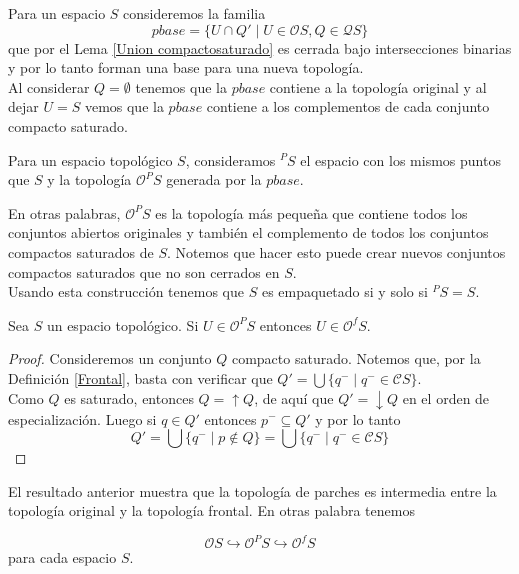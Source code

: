 Para un espacio $S$ consideremos la familia 
\[
pbase=\{U\cap Q'\mid U\in \mathcal{O}S, Q\in \mathcal{Q}S\}
\]
que por el Lema \ref{Union compactosaturado} es cerrada bajo intersecciones binarias y por lo tanto forman una base para una nueva topología.\\

Al considerar $Q=\emptyset$ tenemos que la $pbase$ contiene a la topología original y al dejar $U=S$ vemos que la $pbase$ contiene a los complementos de cada conjunto compacto saturado.\\

\begin{dfn}
    Para un espacio topológico $S$, consideramos $^PS$ el espacio con los mismos puntos que $S$ y la topología $\mathcal{O}^PS$ generada por la $pbase$.
\end{dfn}

En otras palabras, $\mathcal{O}^PS$ es la topología más pequeña que contiene todos los conjuntos abiertos originales y también el complemento de todos los conjuntos compactos saturados de $S$. Notemos que hacer esto puede crear nuevos conjuntos compactos saturados que no son cerrados en $S$.\\

Usando esta construcción tenemos que $S$ es empaquetado si y solo si $^PS=S$.

\begin{lem}
    Sea $S$ un espacio topológico. Si $U\in \mathcal{O}^PS$ entonces $U\in\mathcal{O}^fS$.
\end{lem}

\begin{proof}
    Consideremos un conjunto $Q$ compacto saturado. Notemos que, por la Definición \ref{Frontal}, basta con verificar que $Q'=\bigcup\{q^-\mid q^-\in \mathcal{C}S\}$.\\

    Como $Q$ es saturado, entonces $Q=\uparrow Q$, de aquí que $Q'=\downarrow Q$ en el orden de especialización. Luego si $q\in Q'$ entonces $p^-\subseteq Q'$ y por lo tanto 
    \[
    Q'=\bigcup\{q^-\mid p\notin Q\}=\bigcup\{q^-\mid q^-\in \mathcal{C}S\}
    \]
\end{proof}

El resultado anterior muestra que la topología de parches es intermedia entre la topología original y la topología frontal. En otras palabra tenemos 

\[
\mathcal{O}S \hookrightarrow \mathcal{O}^PS \hookrightarrow \mathcal{O}^fS
\]
para cada espacio $S$.\\

